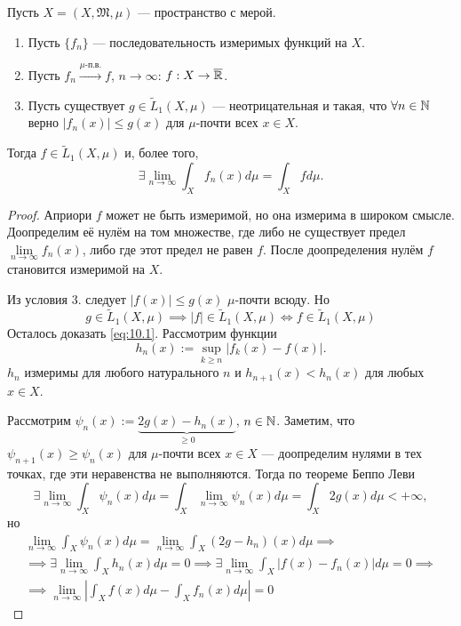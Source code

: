 \begin{theorem}
    Пусть $X = (X, \mathfrak{M}, \mu)$ — пространство с мерой.
    \begin{enumerate}
        \item Пусть $\{f_n\}$ — последовательность измеримых функций на $X$.
        \item Пусть $f_n \xrightarrow{\mu \text{-п.в.}} f$, $n \to \infty$: $f: X \to \overline{\mathbb{R}}$.
        \item Пусть существует $g \in \widetilde{L}_1(X,\mu)$ — неотрицательная и такая, что $\forall n \in \mathbb{N}$ верно $|f_n(x)| \leqslant g(x)$ для $\mu$-почти всех $x \in X$.
    \end{enumerate}
    Тогда $f \in \widetilde{L}_1(X,\mu)$ и, более того,
    \begin{equation}
        \exists \lim\limits_{n \to \infty} \int_X f_n(x) d\mu = \int_X fd\mu. \label{eq:10.1}
    \end{equation}
\end{theorem} 
\begin{proof}
    Априори $f$ может не быть измеримой, но она измерима в широком смысле.
    Доопределим её нулём на том множестве, где либо не существует предел $\lim\limits_{n\to \infty}f_n(x)$, либо где этот предел не равен $f$.
    После доопределения нулём $f$ становится измеримой на $X$.
    
    Из условия 3. следует $|f(x)| \leqslant g(x)$ $\mu$-почти всюду.
    Но 
    $$g \in \widetilde{L}_1(X, \mu)
    \implies
    |f| \in \widetilde{L}_1(X, \mu)
    \Longleftrightarrow
    f \in \widetilde{L}_1(X, \mu)$$
    Осталось доказать \eqref{eq:10.1}.
    Рассмотрим функции
    \[h_n(x) := \sup\limits_{k \geqslant n} |f_k(x) - f(x)|.\]
    $h_n$ измеримы для любого натурального $n$ и $h_{n+1}(x) < h_n(x)$ для любых $x \in X$.
    
    Рассмотрим $\psi_n(x) := \underbrace{2g(x) - h_n(x)}_{\geqslant 0}$, $n \in \mathbb{N}$.
    Заметим, что $\psi_{n+1}(x) \geqslant \psi_n(x)$ для $\mu$-почти всех $x \in X$ — доопределим нулями в тех точках, где эти неравенства не выполняются.
    Тогда по теореме Беппо Леви
    \[\exists \lim\limits_{n \to \infty} \int_X \psi_n(x) d\mu
    = 
    \int_X \lim\limits_{n \to \infty} \psi_n(x) d\mu
    =
    \int_X 2g(x) d\mu < +\infty,\]
    но
    \begin{multline*}
        \lim\limits_{n\to \infty} \int_X \psi_n(x) d\mu
        = 
        \lim\limits_{n\to \infty} \int_X (2g - h_n)(x)d\mu \implies\\\implies 
        \exists \lim\limits_{n\to \infty}\int_X h_n(x)d\mu = 0 \implies
        \exists \lim\limits_{n\to \infty}\int_X |f(x) - f_n(x)| d\mu = 0
        \implies\\\implies
        \lim\limits_{n\to \infty}\left|\int_X f(x)d\mu - \int_X f_n(x)d\mu\right| = 0
    \end{multline*}
\end{proof} 

